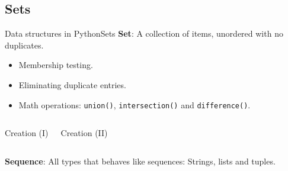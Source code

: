 \documentclass[10pt,compress]{beamer} %
\begin{document}
\subsection{Sets}
\begin{frame}{Data structures in Python}{Sets}
\vspace{-0.2cm}
	\textbf{Set}: A collection of items, unordered with no duplicates.
		\begin{itemize}
		\item \small{Membership testing.}
		\item \small{Eliminating duplicate entries.}
		\item \small{Math operations: \texttt{union()}, \texttt{intersection()} and \texttt{difference()}.}
		\end{itemize}
\vspace{-0.2cm}
    \begin{columns}
 	   \scriptsize{
		\begin{block}{Creation (I)}
		\vspace{-0.2cm}
		
		
		\vspace{-0.2cm}
		\end{block}
		}
		

 	  \scriptsize{
 	   \begin{block}{Creation (II)}
		\vspace{-0.2cm}
		
		
		\vspace{-0.2cm}
		
		\end{block}
		\vspace{0.3cm}
		}
	\end{columns}
	\vspace{0.1cm}
\small{\textbf{Sequence}: All types that behaves like sequences: Strings, lists and tuples.}


\end{frame}

	

%		
\end{document}
